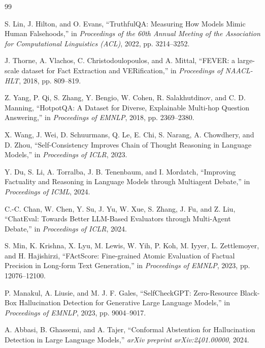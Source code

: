 \documentclass[12pt,a4paper]{report}
\renewcommand{\bibname}{REFERENCES}
\begin{document}
\renewcommand{\bibname}{REFERENCES}
\begin{thebibliography}{99}

S. Lin, J. Hilton, and O. Evans, ``TruthfulQA: Measuring How Models Mimic Human Falsehoods,'' in \textit{Proceedings of the 60th Annual Meeting of the Association for Computational Linguistics (ACL)}, 2022, pp. 3214--3252.

J. Thorne, A. Vlachos, C. Christodoulopoulos, and A. Mittal, ``FEVER: a large-scale dataset for Fact Extraction and VERification,'' in \textit{Proceedings of NAACL-HLT}, 2018, pp. 809--819.

Z. Yang, P. Qi, S. Zhang, Y. Bengio, W. Cohen, R. Salakhutdinov, and C. D. Manning, ``HotpotQA: A Dataset for Diverse, Explainable Multi-hop Question Answering,'' in \textit{Proceedings of EMNLP}, 2018, pp. 2369--2380.

X. Wang, J. Wei, D. Schuurmans, Q. Le, E. Chi, S. Narang, A. Chowdhery, and D. Zhou, ``Self-Consistency Improves Chain of Thought Reasoning in Language Models,'' in \textit{Proceedings of ICLR}, 2023.

Y. Du, S. Li, A. Torralba, J. B. Tenenbaum, and I. Mordatch, ``Improving Factuality and Reasoning in Language Models through Multiagent Debate,'' in \textit{Proceedings of ICML}, 2024.

C.-C. Chan, W. Chen, Y. Su, J. Yu, W. Xue, S. Zhang, J. Fu, and Z. Liu, ``ChatEval: Towards Better LLM-Based Evaluators through Multi-Agent Debate,'' in \textit{Proceedings of ICLR}, 2024.

S. Min, K. Krishna, X. Lyu, M. Lewis, W. Yih, P. Koh, M. Iyyer, L. Zettlemoyer, and H. Hajishirzi, ``FActScore: Fine-grained Atomic Evaluation of Factual Precision in Long-form Text Generation,'' in \textit{Proceedings of EMNLP}, 2023, pp. 12076--12100.

P. Manakul, A. Liusie, and M. J. F. Gales, ``SelfCheckGPT: Zero-Resource Black-Box Hallucination Detection for Generative Large Language Models,'' in \textit{Proceedings of EMNLP}, 2023, pp. 9004--9017.

A. Abbasi, B. Ghassemi, and A. Tajer, ``Conformal Abstention for Hallucination Detection in Large Language Models,'' \textit{arXiv preprint arXiv:2401.00000}, 2024.


\end{thebibliography}
\end{document}
